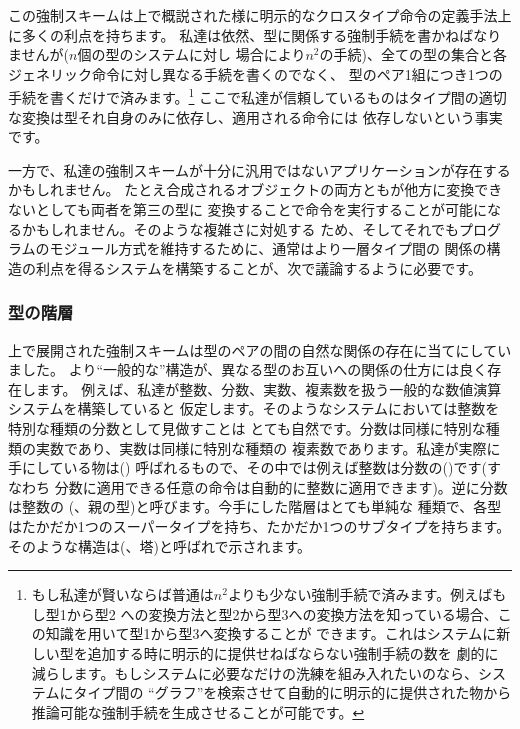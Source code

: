 \noindent
この強制スキームは上で概説された様に明示的なクロスタイプ命令の定義手法上に多くの利点を持ちます。
私達は依然、型に関係する強制手続を書かねばなりませんが(\( n \)個の型のシステムに対し
場合により\( n^2 \)の手続)、全ての型の集合と各ジェネリック命令に対し異なる手続を書くのでなく、
型のペア1組につき1つの手続を書くだけで済みます。\footnote{
もし私達が賢いならば普通は\( n^2 \)よりも少ない強制手続で済みます。例えばもし型1から型2
への変換方法と型2から型3への変換方法を知っている場合、この知識を用いて型1から型3へ変換することが
できます。これはシステムに新しい型を追加する時に明示的に提供せねばならない強制手続の数を
劇的に減らします。もしシステムに必要なだけの洗練を組み入れたいのなら、システムにタイプ間の
``グラフ''を検索させて自動的に明示的に提供された物から推論可能な強制手続を生成させることが可能です。}
ここで私達が信頼しているものはタイプ間の適切な変換は型それ自身のみに依存し、適用される命令には
依存しないという事実です。



一方で、私達の強制スキームが十分に汎用ではないアプリケーションが存在するかもしれません。
たとえ合成されるオブジェクトの両方ともが他方に変換できないとしても両者を第三の型に
変換することで命令を実行することが可能になるかもしれません。そのような複雑さに対処する
ため、そしてそれでもプログラムのモジュール方式を維持するために、通常はより一層タイプ間の
関係の構造の利点を得るシステムを構築することが、次で議論するように必要です。

\subsubsection*{型の階層}



上で展開された強制スキームは型のペアの間の自然な関係の存在に当てにしていました。
より``一般的な''構造が、異なる型のお互いへの関係の仕方には良く存在します。
例えば、私達が整数、分数、実数、複素数を扱う一般的な数値演算システムを構築していると
仮定します。そのようなシステムにおいては整数を特別な種類の分数として見做すことは
とても自然です。分数は同様に特別な種類の実数であり、実数は同様に特別な種類の
複素数であります。私達が実際に手にしている物は()
呼ばれるもので、その中では例えば整数は分数の()です(すなわち
分数に適用できる任意の命令は自動的に整数に適用できます)。逆に分数は整数の
(、親の型)と呼びます。今手にした階層はとても単純な
種類で、各型はたかだか1つのスーパータイプを持ち、たかだか1つのサブタイプを持ちます。
そのような構造は(、塔)と呼ばれで示されます。

